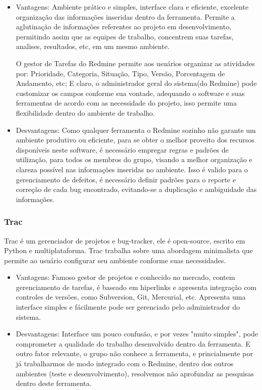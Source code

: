 \documentclass[12pt,a4paper]{article}
\begin{document}
		\begin{itemize}
			\item Vantagens: 
			Ambiente prático e simples, interface clara e eficiente, excelente organização das informações inseridas dentro da ferramenta. Permite a aglutinação de informações referentes ao projeto em desenvolvimento, permitindo assim que as equipes de trabalho, concentrem suas tarefas, analises, resultados, etc, em um mesmo ambiente. 
			
			O gestor de Tarefas do Redmine permite aos usuários organizar as atividades por: Prioridade, Categoria, Situação, Tipo, Versão, Porcentagem de Andamento, etc; E claro, o administrador geral do sistema(do Redmine) pode customizar os campos conforme sua vontade, adequando o software e suas ferramentas de acordo com as necessidade do projeto, isso permite uma flexibilidade dentro do ambiente de trabalho.
			\item Desvantagens: 
			Como qualquer ferramenta o Redmine sozinho não garante um ambiente produtivo ou eficiente, para se obter o melhor proveito dos recursos disponíveis neste software, é necessário empregar regras e padrões de utilização, para todos os membros do grupo, visando a melhor organização e clareza possível nas informações inseridas no ambiente. Isso é valido para o gerenciamento de defeitos, é necessário definir padrões para o reporte e correção de cada bug encontrado, evitando-se a duplicação e ambiguidade das informações. 
		\end{itemize}
		
		\subsubsection{Trac}
		
			Trac é um gerenciador de projetos e bug-tracker, ele é open-source, escrito em Python e multiplataforma. Trac trabalha sobre uma abordagem minimalista que permite ao usuário configurar seu ambiente conforme suas necessidades. 
		
		\begin{itemize}
			\item Vantagens: 
				Famoso gestor de projetos e conhecido no mercado, contem gerenciamento de tarefas, é baseado em hiperlinks e apresenta integração com controles de versões, como Subversion, Git, Mercurial, etc. Apresenta uma interface simples e fácilmente pode ser gerenciado pelo administrador do sistema. 
			\item Desvantagens: 
				Interface um pouco confusão, e por vezes "muito simples", pode comprometer a qualidade do trabalho desenvolvido dentro da ferramenta.
				E outro fator relevante, o grupo não conhece a ferramenta, e princialmente por já trabalharmos de modo integrado com o Redmine, dentro dos outros ambientes (teste e desenvolvimento), resolvemos não aprofundar as pesquisas dentro deste ferramenta.
		\end{itemize}
		
\end{document}
